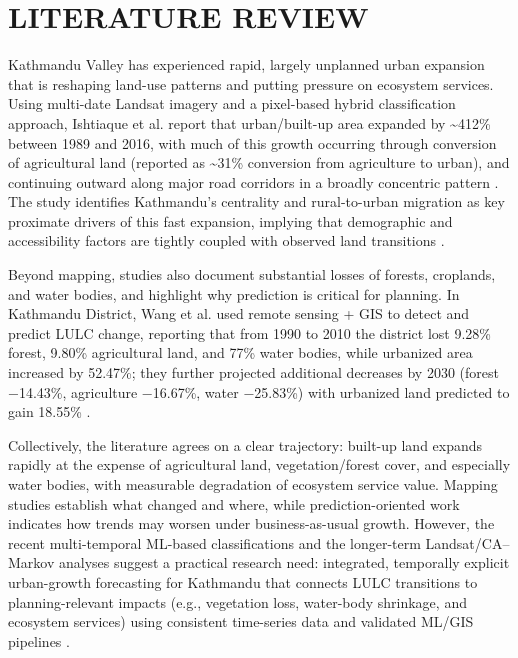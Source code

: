 \documentclass[main]{subfiles}
\begin{document}
\chapter{\MakeUppercase{LITERATURE REVIEW}}

Kathmandu Valley has experienced rapid, largely unplanned urban expansion that is reshaping land-use patterns and putting pressure on ecosystem services. Using multi-date Landsat imagery and a pixel-based hybrid classification approach, Ishtiaque et al. report that urban/built-up area expanded by \textasciitilde 412\% between 1989 and 2016, with much of this growth occurring through conversion of agricultural land (reported as \textasciitilde 31\% conversion from agriculture to urban), and continuing outward along major road corridors in a broadly concentric pattern \cite{environments4040072}. The study identifies Kathmandu’s centrality and rural-to-urban migration as key proximate drivers of this fast expansion, implying that demographic and accessibility factors are tightly coupled with observed land transitions \cite{environments4040072}.

Beyond mapping, studies also document substantial losses of forests, croplands, and water bodies, and highlight why prediction is critical for planning. In Kathmandu District, Wang et al. used remote sensing + GIS to detect and predict LULC change, reporting that from 1990 to 2010 the district lost 9.28\% forest, 9.80\% agricultural land, and 77\% water bodies, while urbanized area increased by 52.47\%; they further projected additional decreases by 2030 (forest −14.43\%, agriculture −16.67\%, water −25.83\%) with urbanized land predicted to gain 18.55\% \cite{wang2020land}.

Collectively, the literature agrees on a clear trajectory: built-up land expands rapidly at the expense of agricultural land, vegetation/forest cover, and especially water bodies, with measurable degradation of ecosystem service value. Mapping studies establish what changed and where, while prediction-oriented work indicates how trends may worsen under business-as-usual growth. However, the recent multi-temporal ML-based classifications and the longer-term Landsat/CA–Markov analyses suggest a practical research need: integrated, temporally explicit urban-growth forecasting for Kathmandu that connects LULC transitions to planning-relevant impacts (e.g., vegetation loss, water-body shrinkage, and ecosystem services) using consistent time-series data and validated ML/GIS pipelines \cite{environments4040072, 10.11648/j.ajese.20250904.12, wang2020land, su142315739}.
\end{document}
